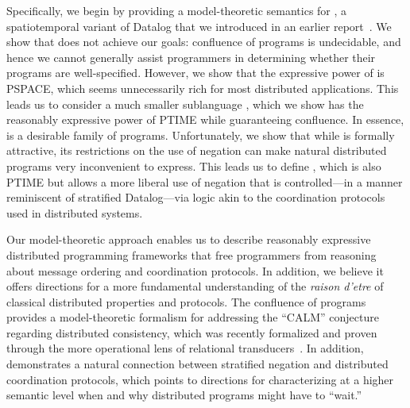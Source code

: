 Specifically, we begin by providing a model-theoretic semantics for \lang, a spatiotemporal variant of Datalog that we introduced in an earlier report~\cite{dedalus}.  We show that \lang does not achieve our goals: confluence of \lang programs is undecidable, and hence we cannot generally assist \lang programmers in determining whether their programs are well-specified.  However, we show that the expressive power of \lang is PSPACE, which seems unnecessarily rich for most distributed applications.  This leads us to consider a much smaller sublanguage \slang, which we show has the reasonably expressive power of PTIME while guaranteeing confluence. In essence, \slang is a desirable family of \lang programs.  Unfortunately, we show that while \slang is formally attractive, its restrictions on the use of negation can make natural distributed programs very inconvenient to express.  This leads us to define \plang, which is also PTIME but allows a more liberal use of negation that is controlled---in a manner reminiscent of stratified Datalog---via logic akin to the coordination protocols used in distributed systems.  

Our model-theoretic approach enables us to describe reasonably expressive distributed programming frameworks that free programmers from reasoning about message ordering and coordination protocols.  In addition, we believe it offers directions for a more fundamental understanding of the {\em raison d'etre} of classical distributed properties and protocols.
The confluence of \slang programs provides a model-theoretic formalism for addressing the ``CALM'' conjecture~\cite{declarative-imperative} regarding distributed consistency, which was recently formalized and proven through the more operational lens of relational transducers~\cite{relational-transducers}.  In addition, \plang demonstrates a natural connection between stratified negation and distributed coordination protocols, which points to directions for characterizing at a higher semantic level when and why distributed programs might have to ``wait.''

